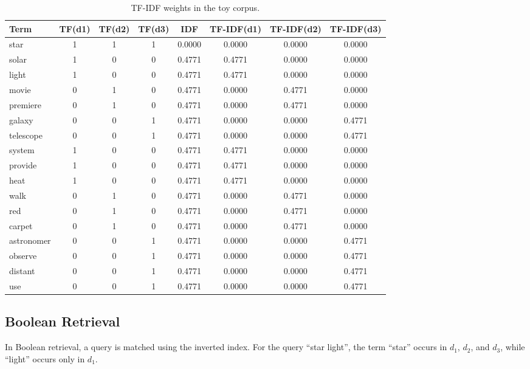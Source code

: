 \begin{table}[h]
\centering
\caption{TF-IDF weights in the toy corpus.}
\label{tab:toy_tfidf}
\begin{tabular}{|l|c|c|c|c|c|c|c|}
\hline
\textbf{Term} & \textbf{TF(d1)} & \textbf{TF(d2)} & \textbf{TF(d3)} & \textbf{IDF} & \textbf{TF-IDF(d1)} & \textbf{TF-IDF(d2)} & \textbf{TF-IDF(d3)} \\ 
\hline
star & 1 & 1 & 1 & 0.0000 & 0.0000 & 0.0000 & 0.0000 \\ 
\hline
solar & 1 & 0 & 0 & 0.4771 & 0.4771 & 0.0000 & 0.0000 \\ 
\hline
light & 1 & 0 & 0 & 0.4771 & 0.4771 & 0.0000 & 0.0000 \\ 
\hline
movie & 0 & 1 & 0 & 0.4771 & 0.0000 & 0.4771 & 0.0000 \\ 
\hline
premiere & 0 & 1 & 0 & 0.4771 & 0.0000 & 0.4771 & 0.0000 \\ 
\hline
galaxy & 0 & 0 & 1 & 0.4771 & 0.0000 & 0.0000 & 0.4771 \\ 
\hline
telescope & 0 & 0 & 1 & 0.4771 & 0.0000 & 0.0000 & 0.4771 \\ 
\hline
system & 1 & 0 & 0 & 0.4771 & 0.4771 & 0.0000 & 0.0000 \\ 
\hline
provide & 1 & 0 & 0 & 0.4771 & 0.4771 & 0.0000 & 0.0000 \\ 
\hline
heat & 1 & 0 & 0 & 0.4771 & 0.4771 & 0.0000 & 0.0000 \\ 
\hline
walk & 0 & 1 & 0 & 0.4771 & 0.0000 & 0.4771 & 0.0000 \\ 
\hline
red & 0 & 1 & 0 & 0.4771 & 0.0000 & 0.4771 & 0.0000 \\ 
\hline
carpet & 0 & 1 & 0 & 0.4771 & 0.0000 & 0.4771 & 0.0000 \\ 
\hline
astronomer & 0 & 0 & 1 & 0.4771 & 0.0000 & 0.0000 & 0.4771 \\ 
\hline
observe & 0 & 0 & 1 & 0.4771 & 0.0000 & 0.0000 & 0.4771 \\ 
\hline
distant & 0 & 0 & 1 & 0.4771 & 0.0000 & 0.0000 & 0.4771 \\ 
\hline
use & 0 & 0 & 1 & 0.4771 & 0.0000 & 0.0000 & 0.4771 \\ 
\hline
\end{tabular}
\end{table}

\subsection{Boolean Retrieval}

In Boolean retrieval, a query is matched using the inverted index. For the
query ``star light'', the term ``star'' occurs in $d_1$, $d_2$, and $d_3$,
while ``light'' occurs only in $d_1$.

